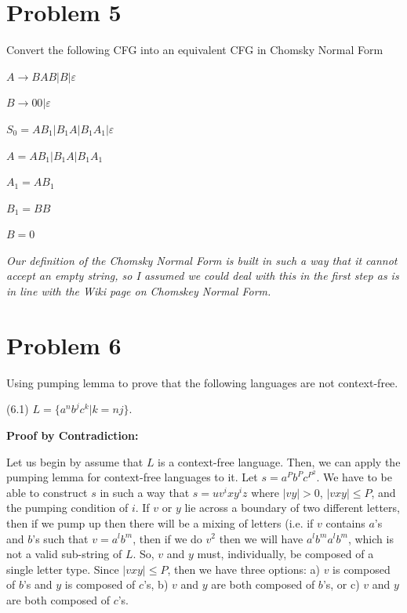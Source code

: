 \documentclass[11pt]{article}
\begin{document}
\newpage

\section*{Problem 5}

\noindent
Convert the following CFG into an equivalent CFG in Chomsky Normal Form

$A\rightarrow BAB|B|\varepsilon$

$B\rightarrow 00|\varepsilon$

    \quad $S_0 = AB_1|B_1A|B_1A_1|\varepsilon$
    
    \quad $A   = AB_1|B_1A|B_1A_1$
    
    \quad $A_1 = AB_1$
    
    \quad $B_1 = BB$
    
    \quad $B = 0$
\newline
    
\emph{Our definition  of the Chomsky Normal Form is built in such a way that it cannot accept an empty string, so I assumed we could deal with this in the first step as is in line with the Wiki page on Chomskey Normal Form.}

\newpage

\section*{Problem 6}

\noindent
Using pumping lemma to prove that the following languages are not
context-free.

(6.1) $L=\{a^nb^jc^k|k=nj\}$.
\newline

\textbf{Proof by Contradiction:}

Let us begin by assume that $L$ is a context-free language. Then, we can apply the pumping lemma for context-free languages to it. Let $s = a^P b^P c^{P^2}$. We have to be able to construct $s$ in such a way that $s = uv^i xy^i z$ where $|vy| > 0$, $|vxy| \leq P$, and the pumping condition of $i$. If $v$ or $y$ lie across a boundary of two different letters, then if we pump up then there will be a mixing of letters (i.e. if $v$ contains $a$'s and $b$'s such that $v=a^l b^m$, then if we do $v^2$ then we will have $a^l b^m a^l b^m$, which is not a valid sub-string of $L$. So, $v$ and $y$ must, individually, be composed of a single letter type. Since $|vxy| \leq P$, then we have three options: a) $v$ is composed of $b$'s and $y$ is composed of $c$'s, b) $v$ and $y$ are both composed of $b$'s, or c) $v$ and $y$ are both composed of $c$'s.
\end{document}
